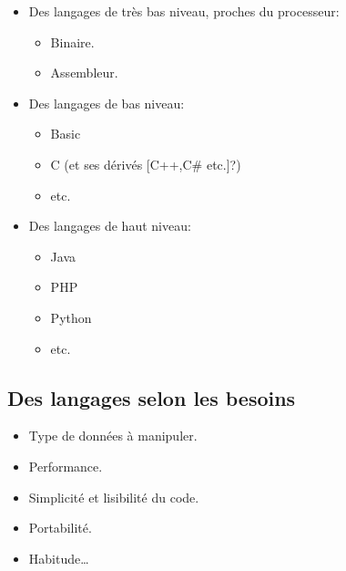 \begin{slide}
	\begin{itemize}
		\item Des langages de très bas niveau, proches du processeur:
		\begin{itemize}
			\item Binaire.
			\item Assembleur.
		
		\end{itemize}
		\item Des langages de bas niveau:		
		\begin{itemize}
			\item Basic
			\item C (et ses dérivés [C++,C\# etc.]?)
			\item etc.
			\relax
		\end{itemize}
		
		\item Des langages de haut niveau:			
		\begin{itemize}
			\item Java
			\item PHP
			\item Python
			\item etc.
			
		\end{itemize}
			
	\end{itemize}
\end{slide}


\subsection{Des langages selon les besoins}
\begin{slide}
	\begin{itemize}
		\item Type de données à manipuler.
		\item Performance.
		\item Simplicité et lisibilité du code.
		\item Portabilité.
		\item Habitude… 
	\end{itemize}
\end{slide}







